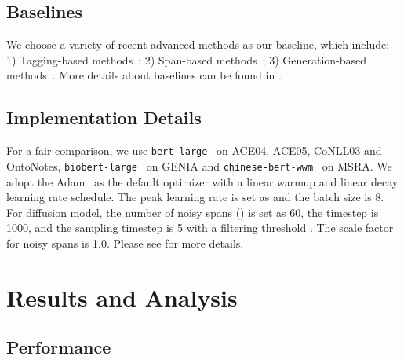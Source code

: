 \documentclass[11pt]{article}
\begin{document}
\subsection{Baselines}

 
We choose a variety of recent advanced methods as our baseline, which include: 1) Tagging-based methods~\citep{strakova-etal-2019-neural, ju-etal-2018-neural, wang-etal-2020-pyramid}; 2) Span-based methods~\citep{yu-etal-2020-named, li-etal-2020-unified, wan-etal-2022-nested, lou-etal-2022-nested, zhu-li-2022-boundary, yuan-etal-2022-fusing}; 3) Generation-based methods~\citep{ijcai2021-542, yan-etal-2021-unified-generative, lu-etal-2022-unified}. More details about baselines can be found in .

\subsection{Implementation Details}
For a fair comparison, we use \texttt{bert-large}~\citep{devlin-etal-2019-bert} on ACE04, ACE05, CoNLL03 and
OntoNotes, \texttt{biobert-large}~\citep{chiu-etal-2016-train} on GENIA and \texttt{chinese-bert-wwm}~\citep{cui-etal-2020-revisiting} on MSRA. We adopt the Adam~\citep{adam} as the default optimizer with a linear warmup and linear decay learning rate schedule. The peak learning rate is set as  and the batch size is 8. For diffusion model, the number of noisy spans  () is set as 60, the timestep  is 1000, and the sampling timestep  is 5 with a filtering threshold . The scale factor  for noisy spans is 1.0.
Please see  for more details.

\section{Results and Analysis}


\subsection{Performance}
\end{document}
